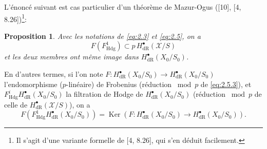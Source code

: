 \documentclass[12pt,a4paper]{article}
\theoremstyle{plain}
\newtheorem{proposition}[theorem]{Proposition}
\theoremstyle{definition}
\theoremstyle{remark}
\DeclareMathOperator{\Ker}{Ker}
\newcommand{\Hdg}{\mathrm{Hdg}}
\begin{document}
\medskip
L'énoncé suivant est cas particulier d'un théorème de Mazur-Ogus ([10], [4, 8.26])\footnote{Il s'agit d'une variante formelle de [4, 8.26], qui s'en déduit facilement.}:

\begin{proposition}\label{prop:2.6}
Avec les notations de \eqref{eq:2.3} et \eqref{eq:2.5}, on a
\[
F(F^1_{\Hdg}) \subset p\, H^{\bullet}_{\mathrm{dR}}(\mathcal{X}/S)
\]
et les deux membres ont même image dans $H^{\bullet}_{\mathrm{dR}}(X_0/S_0)$.
\end{proposition}

En d'autres termes, si l'on note $F: H^{\bullet}_{\mathrm{dR}}(X_0/S_0) \to H^{\bullet}_{\mathrm{dR}}(X_0/S_0)$ l'endomorphisme ($p$-linéaire) de Frobenius (réduction $\bmod p$ de \eqref{eq:2.5.3}), et $F^i_{\Hdg} H^{\bullet}_{\mathrm{dR}}(X_0/S_0)$ la filtration de Hodge de $H^{\bullet}_{\mathrm{dR}}(X_0/S_0)$ (réduction $\bmod p$ de celle de $H^{\bullet}_{\mathrm{dR}}(\mathcal{X}/S)$), on a
\begin{equation}\label{eq:2.6.1}
F(F^1_{\Hdg} H^{\bullet}_{\mathrm{dR}}(X_0/S_0)) = \Ker(F: H^{\bullet}_{\mathrm{dR}}(X_0/S_0) \to H^{\bullet}_{\mathrm{dR}}(X_0/S_0)).
\end{equation}
\end{document}
